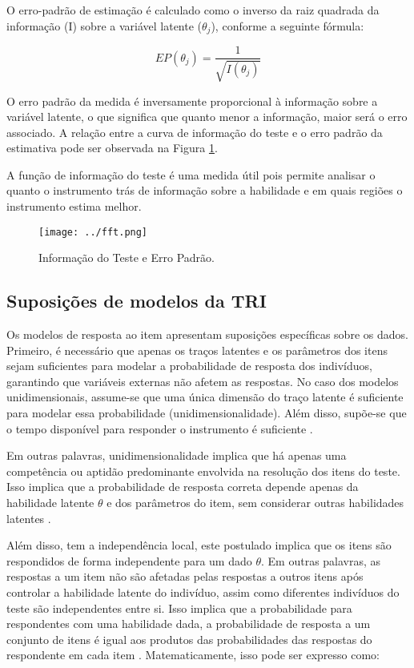  O erro-padrão de estimação é calculado como o inverso da raiz quadrada da informação (I) sobre a variável latente ($\theta_j$), conforme a seguinte fórmula:

\[
EP(\theta_j) = \dfrac{1}{\sqrt{I(\theta_j)}}
\]


O erro padrão da medida é inversamente proporcional à informação sobre a variável latente, o que significa que quanto menor a informação, maior será o erro associado. A relação entre a curva de informação do teste e o erro padrão da estimativa pode ser observada na Figura \ref{fig:fft}.

A função de informação do teste é uma medida útil pois permite analisar o quanto o instrumento trás de informação sobre a habilidade e em quais regiões o instrumento estima melhor.

\begin{figure}[H]
	\centering
	\caption{Informação do Teste e Erro Padrão.}
	\texttt{[image: ../fft.png]}
		\parbox{\textwidth}{
		\centering %
	}
	\label{fig:fft}
\end{figure}



\subsection{Suposições de modelos da TRI}


Os modelos de resposta ao item apresentam suposições específicas sobre os dados. Primeiro, é necessário que apenas os traços latentes e os parâmetros dos itens sejam suficientes para modelar a probabilidade de resposta dos indivíduos, garantindo que variáveis externas não afetem as respostas.  No caso dos modelos unidimensionais, assume-se que uma única dimensão do traço latente é suficiente para modelar essa probabilidade (unidimensionalidade). Além disso, supõe-se que o tempo disponível para responder o instrumento é suficiente \cite{caio2010}.


Em outras palavras, unidimensionalidade implica que há apenas uma competência ou aptidão predominante envolvida na resolução dos itens do teste. Isso implica que a probabilidade de resposta correta depende apenas da habilidade latente $\theta$ e dos parâmetros do item, sem considerar outras habilidades latentes \cite{pasquali1996}.


Além disso, tem a independência local, este postulado implica que os itens são respondidos de forma independente para um dado $\theta$. Em outras palavras, as respostas a um item não são afetadas pelas respostas a outros itens após controlar a habilidade latente do indivíduo, assim como diferentes indivíduos do teste são independentes entre si. Isso implica que a probabilidade para respondentes com uma habilidade dada, a probabilidade de resposta a um conjunto de itens é igual aos produtos das probabilidades das respostas do respondente em cada item \cite{pasquali1996}. Matematicamente, isso pode ser expresso como:


